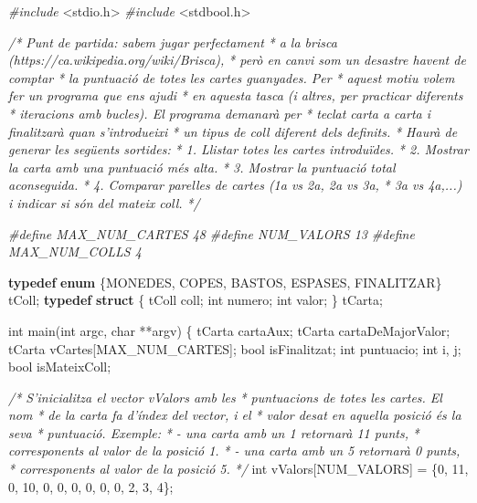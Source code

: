 \documentclass[]{book}
\newenvironment{Shaded}{\begin{snugshade}}{\end{snugshade}}
\newcommand{\KeywordTok}[1]{\textcolor[rgb]{0.13,0.29,0.53}{\textbf{#1}}}
\newcommand{\DataTypeTok}[1]{\textcolor[rgb]{0.13,0.29,0.53}{#1}}
\newcommand{\DecValTok}[1]{\textcolor[rgb]{0.00,0.00,0.81}{#1}}
\newcommand{\ImportTok}[1]{#1}
\newcommand{\CommentTok}[1]{\textcolor[rgb]{0.56,0.35,0.01}{\textit{#1}}}
\newcommand{\PreprocessorTok}[1]{\textcolor[rgb]{0.56,0.35,0.01}{\textit{#1}}}
\newcommand{\NormalTok}[1]{#1}
\begin{document}
\begin{Shaded}
\begin{Highlighting}[]
\PreprocessorTok{#include }\ImportTok{<stdio.h>}
\PreprocessorTok{#include }\ImportTok{<stdbool.h>}

\CommentTok{/* Punt de partida: sabem jugar perfectament}
\CommentTok{ * a la brisca (https://ca.wikipedia.org/wiki/Brisca), }
\CommentTok{ * però en canvi som un desastre havent de comptar}
\CommentTok{ * la puntuació de totes les cartes guanyades. Per}
\CommentTok{ * aquest motiu volem fer un programa que ens ajudi}
\CommentTok{ * en aquesta tasca (i altres, per practicar diferents}
\CommentTok{ * iteracions amb bucles). El programa demanarà per }
\CommentTok{ * teclat carta a carta i finalitzarà quan s'introdueixi}
\CommentTok{ * un tipus de coll diferent dels definits.}
\CommentTok{ * Haurà de generar les següents sortides:}
\CommentTok{ * 1. Llistar totes les cartes introduïdes.}
\CommentTok{ * 2. Mostrar la carta amb una puntuació més alta.}
\CommentTok{ * 3. Mostrar la puntuació total aconseguida.}
\CommentTok{ * 4. Comparar parelles de cartes (1a vs 2a, 2a vs 3a,}
\CommentTok{ *    3a vs 4a,...) i indicar si són del mateix coll.}
\CommentTok{ */}

\PreprocessorTok{#define MAX_NUM_CARTES 48}
\PreprocessorTok{#define NUM_VALORS 13}
\PreprocessorTok{#define MAX_NUM_COLLS 4}

\KeywordTok{typedef} \KeywordTok{enum}\NormalTok{ \{MONEDES, COPES, BASTOS, ESPASES, FINALITZAR\} tColl;}
\KeywordTok{typedef} \KeywordTok{struct}\NormalTok{ \{}
\NormalTok{    tColl coll;}
    \DataTypeTok{int}\NormalTok{ numero;}
    \DataTypeTok{int}\NormalTok{ valor;}
\NormalTok{\} tCarta;}

\DataTypeTok{int}\NormalTok{ main(}\DataTypeTok{int}\NormalTok{ argc, }\DataTypeTok{char}\NormalTok{ **argv) \{}
\NormalTok{    tCarta cartaAux;}
\NormalTok{    tCarta cartaDeMajorValor;}
\NormalTok{    tCarta vCartes[MAX_NUM_CARTES];}
\NormalTok{    bool isFinalitzat;}
    \DataTypeTok{int}\NormalTok{ puntuacio;}
    \DataTypeTok{int}\NormalTok{ i, j;}
\NormalTok{    bool isMateixColl;}
    
    \CommentTok{/* S'inicialitza el vector vValors amb les}
\CommentTok{     * puntuacions de totes les cartes. El nom}
\CommentTok{     * de la carta fa d'índex del vector, i el}
\CommentTok{     * valor desat en aquella posició és la seva}
\CommentTok{     * puntuació. Exemple: }
\CommentTok{     * - una carta amb un 1 retornarà 11 punts,}
\CommentTok{     *   corresponents al valor de la posició 1.}
\CommentTok{     * - una carta amb un 5 retornarà 0 punts,}
\CommentTok{     *   corresponents al valor de la posició 5.}
\CommentTok{     */}
    \DataTypeTok{int}\NormalTok{ vValors[NUM_VALORS] = \{}\DecValTok{0}\NormalTok{, }\DecValTok{11}\NormalTok{, }\DecValTok{0}\NormalTok{, }\DecValTok{10}\NormalTok{, }\DecValTok{0}\NormalTok{, }\DecValTok{0}\NormalTok{, }\DecValTok{0}\NormalTok{, }\DecValTok{0}\NormalTok{, }\DecValTok{0}\NormalTok{, }\DecValTok{0}\NormalTok{, }\DecValTok{2}\NormalTok{, }\DecValTok{3}\NormalTok{, }\DecValTok{4}\NormalTok{\};}


\end{Highlighting}
\end{Shaded}
\end{document}
